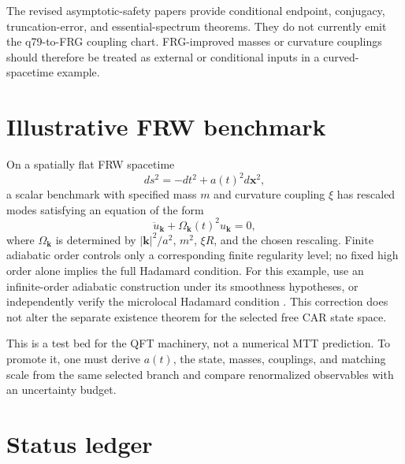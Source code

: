 \documentclass[11pt]{article}
\theoremstyle{definition}
\theoremstyle{remark}
\begin{document}
The revised asymptotic-safety papers provide conditional endpoint,
conjugacy, truncation-error, and essential-spectrum theorems. They do not
currently emit the q79-to-FRG coupling chart. FRG-improved masses or
curvature couplings should therefore be treated as external or conditional
inputs in a curved-spacetime example.

\section{Illustrative FRW benchmark}

On a spatially flat FRW spacetime
\[
 ds^2=-dt^2+a(t)^2d\mathbf x^2,
\]
a scalar benchmark with specified mass \(m\) and curvature coupling \(\xi\)
has rescaled modes satisfying an equation of the form
\[
 \ddot u_{\mathbf k}
 +\Omega_{\mathbf k}(t)^2u_{\mathbf k}=0,
\]
where \(\Omega_{\mathbf k}\) is determined by
\(|\mathbf k|^2/a^2\), \(m^2\), \(\xi R\), and the chosen rescaling.
Finite adiabatic order controls only a corresponding finite regularity
level; no fixed high order alone implies the full Hadamard condition. For
this example, use an infinite-order adiabatic construction under its
smoothness hypotheses, or independently verify the microlocal Hadamard
condition \cite{Pirk1993,JunkerSchrohe}. This correction does not alter the
separate existence theorem for the selected free CAR state space.

This is a test bed for the QFT machinery, not a numerical MTT prediction.
To promote it, one must derive \(a(t)\), the state, masses, couplings, and
matching scale from the same selected branch and compare renormalized
observables with an uncertainty budget.

\section{Status ledger}
\end{document}

